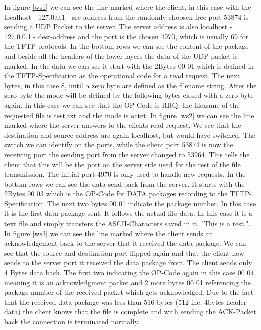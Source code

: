 \documentclass[a4paper,12pt]{article}
\numberwithin{figure}{section}
\begin{document}
In figure \ref{ws1} we can see the line marked where the client, in this case with the localhost - 127.0.0.1 - src-address from the randomly choosen free port 53874 is sending a UDP Packet to the server. The server address is also localhost - 127.0.0.1 - dest-address and the port is the chosen 4970, which is usually 69 for the TFTP protocols. In the bottom rows we can see the content of the package and beside all the headers of the lower layers the data of the UDP packet is marked. In the data we can see it start with the 2Bytes 00 01 which is defined in the TFTP-Specification as the operational code for a read request. The next bytes, in this case 8, until a zero byte are defined as the filename string. After the zero byte the mode will be defined by the following bytes closed with a zero byte again. In this case we can see that the OP-Code is RRQ, the filename of the requested file is test.txt and the mode is octet.
\newline \noindent
\newline \noindent
In figure \ref{ws2} we can see the line marked where the server answers to the clients read request. We see that the destination and source address are again localhost, but would have switched. The switch we can identify on the ports, while the client port 53874 is now the receiving port the sending port from the server changed to 53964. This tells the client that this will be the port on the server side used for the rest of the file transmission. The initial port 4970 is only used to handle new requests. In the bottom rows we can see the data send back from the server. It starts with the 2Bytes 00 03 which is the OP-Code for DATA packages recording to the TFTP-Specification. The next two bytes 00 01 indicate the package number. In this case it is the first data package sent. It follows the actual file-data. In this case it is a text file and simply transfers the ASCII-Characters saved in it, "This is a test.".
\newline \noindent
\newline \noindent
In figure \ref{ws3} we can see the line marked where the client sends an acknowledgement back to the server that it received the data package. We can see that the source and destination port flipped again and that the client now sends to the server port it received the data package from. The client sends only 4 Bytes data back. The first two indicating the OP-Code again in this case 00 04, meaning it is an acknowledgment packet and 2 more bytes 00 01 referencing the package number of the received packet which gets acknowledged. Due to the fact that the received data package was less than 516 bytes (512 inc. 4bytes header data) the client knows that the file is complete and with sending the ACK-Packet back the connection is terminated normally.
\end{document}
